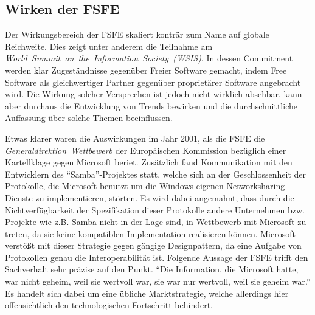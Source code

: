 \subsection{Wirken der FSFE}
Der Wirkungsbereich der FSFE skaliert konträr zum Name auf globale Reichweite. 
Dies zeigt unter anderem die Teilnahme am 
\emph{World~Summit~on~the~Information~Society~(WSIS)}. In dessen 
Commitment~\cite{WSISTunisCommitment} werden klar Zugeständnisse gegenüber 
Freier Software gemacht, indem Free Software als gleichwertiger Partner 
gegenüber proprietärer Software angebracht wird. Die Wirkung solcher Versprechen
ist jedoch nicht wirklich absehbar, kann aber durchaus die Entwicklung von 
Trends bewirken und die durchschnittliche Auffassung über solche Themen 
beeinflussen.

Etwas klarer waren die Auswirkungen im Jahr 2001, als die FSFE die 
\emph{Generaldirektion~Wettbewerb} der Europäischen Kommission bezüglich einer 
Kartellklage gegen Microsoft beriet. Zusätzlich fand Kommunikation mit den 
Entwicklern des ``Samba''-Projektes statt, welche sich an der Geschlossenheit 
der Protokolle, die Microsoft benutzt um die Windows-eigenen 
Networksharing-Dienste zu implementieren, störten. Es wird dabei angemahnt, 
dass durch die Nichtverfügbarkeit der Spezifikation dieser Protokolle andere 
Unternehmen bzw. Projekte wie z.B. Samba nicht in der Lage sind, in Wettbewerb 
mit Microsoft zu treten, da sie keine kompatiblen Implementation realisieren 
können. Microsoft verstößt mit dieser Strategie gegen gängige Designpattern, da 
eine Aufgabe von Protokollen genau die Interoperabilität ist. Folgende Aussage 
der FSFE trifft den Sachverhalt sehr präzise auf den Punkt. ``Die 
Information, die Microsoft hatte, war nicht geheim, weil sie wertvoll war, sie 
war nur wertvoll, weil sie geheim war.'' \cite{FsfeEUvsMS} Es handelt sich 
dabei um eine übliche Marktstrategie, welche allerdings hier offensichtlich den 
technologischen Fortschritt behindert.

